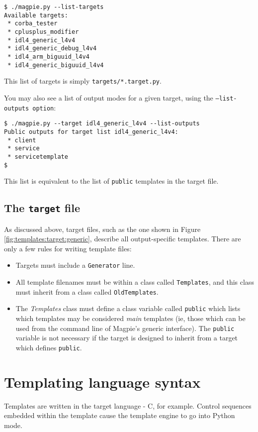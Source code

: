 \begin{verbatim}
$ ./magpie.py --list-targets
Available targets:
 * corba_tester
 * cplusplus_modifier
 * idl4_generic_l4v4
 * idl4_generic_debug_l4v4
 * idl4_arm_biguuid_l4v4
 * idl4_generic_biguuid_l4v4
\end{verbatim}

This list of targets is simply {\tt targets/*.target.py}.

You may also see a list of output modes for a given target, using the {\tt --list-outputs option}:

\begin{verbatim}
$ ./magpie.py --target idl4_generic_l4v4 --list-outputs
Public outputs for target list idl4_generic_l4v4:
 * client
 * service
 * servicetemplate
$
\end{verbatim}

This list is equivalent to the list of {\tt public} templates in the target file. 

\subsection{The {\tt target} file}
As discussed above, target files, such as the one shown in Figure \ref{fig:templates:target:generic}, describe all output-specific templates. There are only a few rules for writing template files:

\begin{itemize}
\item Targets must include a {\tt Generator} line.
\item All template filenames must be within a class called {\tt Templates}, and this class must inherit from a class called {\tt OldTemplates}.
\item The {\em Templates} class must define a class variable called {\tt public} which lists which templates may be considered {\em main} templates (ie, those which can be used from the command line of Magpie's generic interface). The {\tt public} variable is not necessary if the target is designed to inherit from a target which defines {\tt public}.
\end{itemize}

\section{Templating language syntax}
Templates are written in the target language - C, for example. Control sequences embedded within the template cause the template engine to go into Python mode. 

